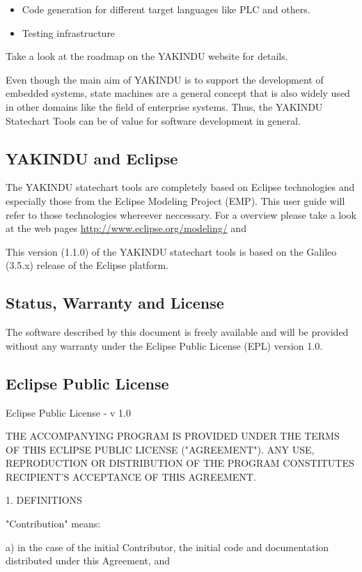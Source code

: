 \begin{itemize}
\item Code generation for different target languages like PLC and others. 
\item Testing infrastructure
\end{itemize}

Take a look at the roadmap on the YAKINDU website for details.

Even though the main aim of YAKINDU is to support the development of embedded
systems, state machines are a general concept that is also widely used in
other domains like the field of enterprise systems. Thus, the YAKINDU
Statechart Tools can be of value for software development in general.


\subsection{YAKINDU and Eclipse}

The YAKINDU statechart tools are completely based on Eclipse technologies and
especially those from the Eclipse Modeling Project (EMP). This user guide will refer to those technologies
whereever neccessary. For a overview please take a look at the web pages
\url{http://www.eclipse.org/modeling/} and

This version (1.1.0) of the YAKINDU statechart tools is based on the Galileo (3.5.x) release of the Eclipse platform.
  
  
\subsection{Status, Warranty and License}
The software described by this document is freely available and will be provided without
any warranty under the Eclipse Public License (EPL) version 1.0. 


\subsection{Eclipse Public License}

Eclipse Public License - v 1.0

THE ACCOMPANYING PROGRAM IS PROVIDED UNDER THE TERMS OF THIS
ECLIPSE PUBLIC LICENSE ("AGREEMENT"). ANY USE, REPRODUCTION OR
DISTRIBUTION OF THE PROGRAM CONSTITUTES RECIPIENT'S ACCEPTANCE
OF THIS AGREEMENT.


1. DEFINITIONS

"Contribution" means:

a) in the case of the initial Contributor, the initial code and
documentation distributed under this Agreement, and

